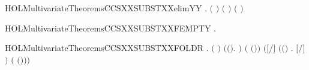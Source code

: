 \newcommand{\HOLMultivariateTheoremsCCSXXSUBSTXXelim}{\UseVerbatim{HOLMultivariateTheoremsCCSXXSUBSTXXelim}}
\begin{SaveVerbatim}{HOLMultivariateTheoremsCCSXXSUBSTXXelimYY}
\HOLTokenTurnstile{} \HOLSymConst{\HOLTokenForall{}} .  \ensuremath{(} \ensuremath{)} \ensuremath{(} \ensuremath{)} \HOLSymConst{\HOLTokenImp{}} \ensuremath{(}   \HOLSymConst{\ensuremath{=}} \ensuremath{)}
\end{SaveVerbatim}
\newcommand{\HOLMultivariateTheoremsCCSXXSUBSTXXelimYY}{\UseVerbatim{HOLMultivariateTheoremsCCSXXSUBSTXXelimYY}}
\begin{SaveVerbatim}{HOLMultivariateTheoremsCCSXXSUBSTXXFEMPTY}
\HOLTokenTurnstile{} \HOLSymConst{\HOLTokenForall{}}.    \HOLSymConst{\ensuremath{=}} 
\end{SaveVerbatim}
\newcommand{\HOLMultivariateTheoremsCCSXXSUBSTXXFEMPTY}{\UseVerbatim{HOLMultivariateTheoremsCCSXXSUBSTXXFEMPTY}}
\begin{SaveVerbatim}{HOLMultivariateTheoremsCCSXXSUBSTXXFOLDR}
\HOLTokenTurnstile{} \HOLSymConst{\HOLTokenForall{}}  .
         \HOLSymConst{\HOLTokenConj{}} \ensuremath{(}  \HOLSymConst{\ensuremath{=}}  \ensuremath{)} \HOLSymConst{\HOLTokenConj{}}
        \ensuremath{(}\HOLTokenLambda{}\ensuremath{(}\HOLSymConst{,}\ensuremath{)}.   \HOLConst{\HOLTokenSubset{}} \HOLTokenLeftbrace{}\HOLTokenRightbrace{}\ensuremath{)} \ensuremath{(} \ensuremath{(}\HOLSymConst{,}\ensuremath{)}\ensuremath{)} \HOLSymConst{\HOLTokenImp{}}
       \ensuremath{(}\ensuremath{[}\ensuremath{/}\ensuremath{]}  \HOLSymConst{\ensuremath{=}}  \ensuremath{(}\HOLTokenLambda{}\ensuremath{(}\HOLSymConst{,}\ensuremath{)} . \ensuremath{[}\ensuremath{/}\ensuremath{]} \ensuremath{)}  \ensuremath{(} \ensuremath{(}\HOLSymConst{,}\ensuremath{)}\ensuremath{)}\ensuremath{)}
\end{SaveVerbatim}

